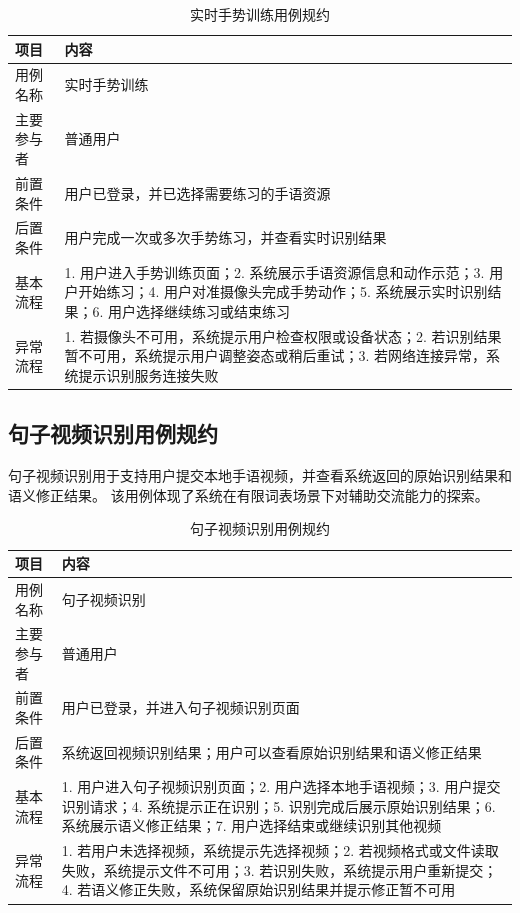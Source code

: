 \begin{longtable}{p{}p{}}
  \caption{实时手势训练用例规约}
  \label{tab:realtime-training-usecase}\\
  \toprule
  \textbf{项目} & \textbf{内容} \\
  \midrule
  用例名称 & 实时手势训练 \\
  主要参与者 & 普通用户 \\
  前置条件 & 用户已登录，并已选择需要练习的手语资源 \\
  后置条件 & 用户完成一次或多次手势练习，并查看实时识别结果 \\
  基本流程 & 1. 用户进入手势训练页面；2. 系统展示手语资源信息和动作示范；3. 用户开始练习；4. 用户对准摄像头完成手势动作；5. 系统展示实时识别结果；6. 用户选择继续练习或结束练习 \\
  异常流程 & 1. 若摄像头不可用，系统提示用户检查权限或设备状态；2. 若识别结果暂不可用，系统提示用户调整姿态或稍后重试；3. 若网络连接异常，系统提示识别服务连接失败 \\
  \bottomrule
\end{longtable}

\subsection{句子视频识别用例规约}

句子视频识别用于支持用户提交本地手语视频，并查看系统返回的原始识别结果和语义修正结果。
该用例体现了系统在有限词表场景下对辅助交流能力的探索。

\begin{longtable}{p{}p{}}
  \caption{句子视频识别用例规约}
  \label{tab:sentence-video-usecase}\\
  \toprule
  \textbf{项目} & \textbf{内容} \\
  \midrule
  用例名称 & 句子视频识别 \\
  主要参与者 & 普通用户 \\
  前置条件 & 用户已登录，并进入句子视频识别页面 \\
  后置条件 & 系统返回视频识别结果；用户可以查看原始识别结果和语义修正结果 \\
  基本流程 & 1. 用户进入句子视频识别页面；2. 用户选择本地手语视频；3. 用户提交识别请求；4. 系统提示正在识别；5. 识别完成后展示原始识别结果；6. 系统展示语义修正结果；7. 用户选择结束或继续识别其他视频 \\
  异常流程 & 1. 若用户未选择视频，系统提示先选择视频；2. 若视频格式或文件读取失败，系统提示文件不可用；3. 若识别失败，系统提示用户重新提交；4. 若语义修正失败，系统保留原始识别结果并提示修正暂不可用 \\
  \bottomrule
\end{longtable}

